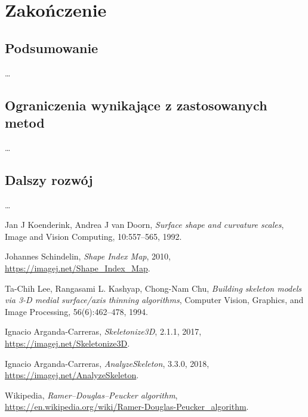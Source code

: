 \documentclass[declaration,shortabstract,mgr]{iithesis}
\begin{document}

\chapter{Zakończenie}

\section{Podsumowanie}
\ldots %
\section{Ograniczenia wynikające z zastosowanych metod}
\ldots %
\section{Dalszy rozwój}
\ldots %







\begin{thebibliography}{1}

  Jan J Koenderink, Andrea J van Doorn,
  \emph{Surface shape and curvature scales},
  Image and Vision Computing,
  10:557--565,
  1992.

  Johannes Schindelin,
  \emph{Shape Index Map},
  2010,
  \url{https://imagej.net/Shape_Index_Map}.

  Ta-Chih Lee, Rangasami L. Kashyap, Chong-Nam Chu,
  \emph{Building skeleton models via 3-D medial surface/axis thinning algorithms},
  Computer Vision, Graphics, and Image Processing,
  56(6):462--478,
  1994.

  Ignacio Arganda-Carreras,
  \emph{Skeletonize3D},
  2.1.1,
  2017,
  \url{https://imagej.net/Skeletonize3D}.

  Ignacio Arganda-Carreras,
  \emph{AnalyzeSkeleton},
  3.3.0,
  2018,
  \url{https://imagej.net/AnalyzeSkeleton}.
  
  Wikipedia,
  \emph{Ramer--Douglas--Peucker algorithm},
  \url{https://en.wikipedia.org/wiki/Ramer-Douglas-Peucker_algorithm}.

\end{thebibliography}
\end{document}
